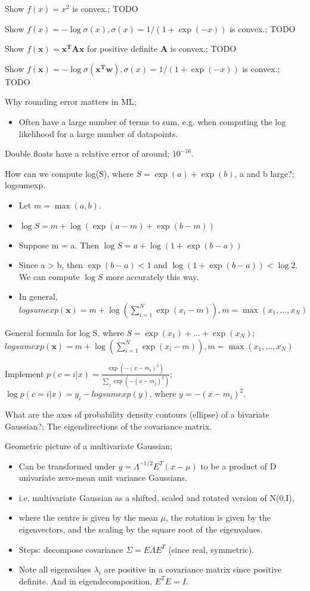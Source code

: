 \documentclass{article}
\begin{document}
Show $f(x)=x^2$ is convex.; TODO

Show $f(x) = -\log \sigma(x), \sigma(x)=1/(1+\exp(-x))$ is convex.; TODO

Show $f(\mathbf{x}) = \mathbf{x^TAx}$ for positive definite $\mathbf{A}$ is convex.; TODO

Show $f(\mathbf{x}) = -\log\sigma(\mathbf{x^Tw}),\sigma(x)=1/(1+\exp(-x))$ is convex.; TODO 

Why rounding error matters in ML; \begin{itemize} \item Often have a large number of terms to sum, e.g. when computing the log likelihood for a large number of datapoints. \end{itemize}

Double floats have a relative error of around; $10^{-16}$.

How can we compute log(S), where $S=\exp(a)+\exp(b)$, a and b large?; logsumexp. \begin{itemize} \item Let $m=\max(a,b)$. \item $\log S = m+\log(\exp(a-m)+\exp(b-m))$ \item Suppose m = a. Then $\log S = a + \log(1+\exp(b-a))$ \item Since a > b, then $\exp(b-a)<1$ and $\log(1+\exp(b-a))<\log 2$. We can compute $\log S$ more accurately this way. \item In general, $logsumexp(\mathbf{x})=m+\log(\sum_{i=1}^N\exp(x_i-m)), m=\max(x_1,...,x_N)$ \end{itemize}

General formula for log S, where $S=\exp(x_1)+...+\exp(x_N)$; $logsumexp(\mathbf{x})=m+\log(\sum_{i=1}^N\exp(x_i-m)), m=\max(x_1,...,x_N)$

Implement $p(c=i|x)=\frac{\exp(-(x-m_i)^2)}{\sum_j \exp(-(x-m_j)^2)}$; $\log p(c=i|x) = y_i - logsumexp(y)$, where $y=-(x - m_i)^2$.

What are the axes of probability density contours (ellipse) of a bivariate Gaussian?; The eigendirections of the covariance matrix.

Geometric picture of a multivariate Gaussian; \begin{itemize} \item Can be transformed under $y=\Lambda^{-1/2}E^T(x-\mu)$ to be a product of D univariate zero-mean unit variance Gaussians. \item i.e. multivariate Gaussian as a shifted, scaled and rotated version of N(0,I),  \item where the centre is given by the mean $\mu$, the rotation is given by the eigenvectors, and the scaling by the square root of the eigenvalues. \item Steps: decompose covariance $\Sigma = E\Lambda E^T$ (since real, symmetric).  \item Note all eigenvalues $\lambda_i$ are positive in a covariance matrix since positive definite. And in eigendecomposition, $E^TE=I$. \end{itemize}
\end{document}
